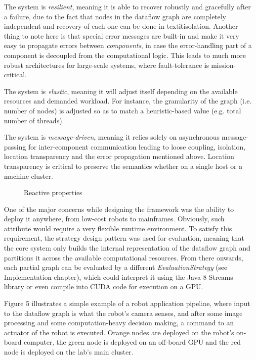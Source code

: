 \documentclass{dithesis}
\begin{document}
The system is \textit{resilient}, meaning it is able to recover robustly and gracefully after a failure, due to the fact that nodes in the dataflow graph are completely independent and recovery of each one can be done in textit{isolation}. Another thing to note here is that special error messages are built-in and make it very easy to propagate errors between \textit{components}, in case the error-handling part of a component is decoupled from the computational logic. This leads to much more robust architectures for large-scale systems, where fault-tolerance is mission-critical.

The system is \textit{elastic}, meaning it will adjust itself depending on the available resources and demanded workload. For instance, the granularity of the graph (i.e. number of nodes) is adjusted so as to match a heuristic-based value (e.g. total number of threads).

The system is \textit{message-driven}, meaning it relies solely on asynchronous message-passing for inter-component communication leading to loose coupling, isolation, location transparency and the error propagation mentioned above. Location transparency is critical to preserve the semantics whether on a single host or a machine cluster. 

\begin{figure}[h!] 
	\centering    
  	 
  	\caption{Reactive properties}
\end{figure}


One of the major concerns while designing the framework was the ability to deploy it anywhere, from low-cost robots to mainframes. Obviously, such attribute would require a very flexible runtime environment. To satisfy this requirement, the strategy design pattern was used for evaluation, meaning that the core system only builds the internal representation of the dataflow graph and partitions it across the available computational resources. From there onwards, each partial graph can be evaluated by a different \textit{EvaluationStrategy} (see Implementation chapter), which could interpret it using the Java 8 Streams library or even compile into CUDA code for execution on a GPU.

Figure 5 illustrates a simple example of a robot application pipeline, where input to the dataflow graph is what the robot's camera senses, and after some image processing and some computation-heavy decision making, a command to an actuator of the robot is executed. Orange nodes are deployed on the robot's on-board computer, the green node is deployed on an off-board GPU and the red node is deployed on the lab's main cluster.
\end{document}
